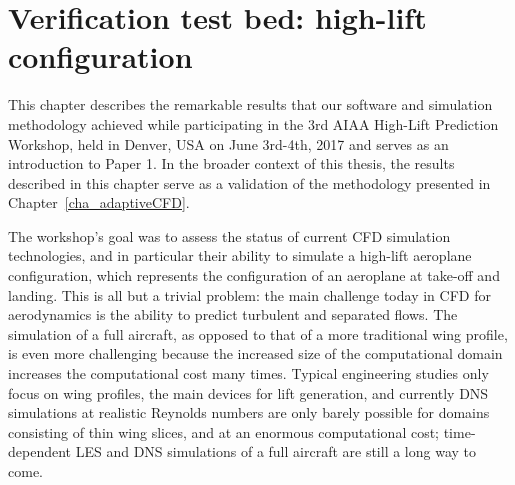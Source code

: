 \chapter{Verification test bed: high-lift configuration}
\label{cha_hlpw}
This chapter describes the remarkable results that our software and simulation methodology achieved while participating in the 3rd AIAA High-Lift Prediction Workshop, held in Denver, USA on June 3rd-4th, 2017 and serves as an introduction to Paper 1.
In the broader context of this thesis, the results described in this chapter serve as a validation of the methodology presented in Chapter~\ref{cha_adaptiveCFD}.

The workshop's goal was to assess the status of current CFD simulation technologies, and in particular their ability to simulate a high-lift aeroplane configuration, which represents the configuration of an aeroplane at take-off and landing.
This is all but a trivial problem: the main challenge today in CFD for aerodynamics is the ability to predict turbulent and separated flows.
The simulation of a full aircraft, as opposed to that of a more traditional wing profile, is even more challenging because the increased size of the computational domain increases the computational cost many times.
Typical engineering studies only focus on wing profiles, the main devices for lift generation, and currently DNS simulations at realistic Reynolds numbers are only barely possible for domains consisting of thin wing slices, and at an enormous computational cost; time-dependent LES and DNS simulations of a full aircraft are still a long way to come.

